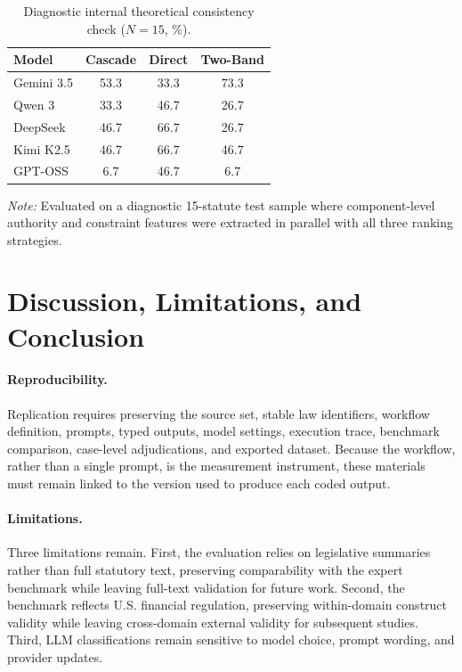 \documentclass[runningheads]{llncs}
\begin{document}
\vspace{2mm}
\begin{table}[htbp]
\centering
\caption{Diagnostic internal theoretical consistency check ($N=15$, \%).}
\label{tab:consistency}
\scriptsize
\begin{tabular}{@{}lccc@{}}
\toprule
\textbf{Model} & \textbf{Cascade} & \textbf{Direct} & \textbf{Two-Band} \\
\midrule
Gemini 3.5 & 53.3 & 33.3 & 73.3 \\
Qwen 3     & 33.3 & 46.7 & 26.7 \\
DeepSeek   & 46.7 & 66.7 & 26.7 \\
Kimi K2.5  & 46.7 & 66.7 & 46.7 \\
GPT-OSS    & 6.7  & 46.7 & 6.7  \\
\bottomrule
\end{tabular}

\vspace{3mm}
\parbox{\columnwidth}{\scriptsize \textit{Note:} Evaluated on a diagnostic 15-statute test sample where component-level authority and constraint features were extracted in parallel with all three ranking strategies.}
\end{table}



\clearpage
\section{Discussion, Limitations, and Conclusion}
\vspace{-0.2cm}
\paragraph{Reproducibility.} Replication requires preserving the source set, stable law identifiers, workflow definition, prompts, typed outputs, model settings, execution trace, benchmark comparison, case-level adjudications, and exported dataset. Because the workflow, rather than a single prompt, is the measurement instrument, these materials must remain linked to the version used to produce each coded output.
\vspace{-0.2cm}
\paragraph{Limitations.} Three limitations remain. First, the evaluation relies on legislative summaries rather than full statutory text, preserving comparability with the expert benchmark while leaving full-text validation for future work. Second, the benchmark reflects U.S. financial regulation, preserving within-domain construct validity while leaving cross-domain external validity for subsequent studies. Third, LLM classifications remain sensitive to model choice, prompt wording, and provider updates.
\vspace{-0.2cm}
\end{document}
